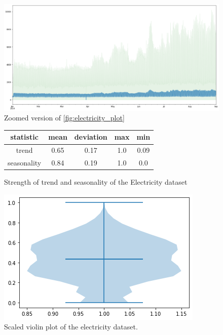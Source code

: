 \begin{figure}[htb]
    \centering
    \includegraphics[width=\linewidth]{./img/electricity_no_negative.png}
    \caption{Zoomed version of \ref{fig:electricity_plot}}
    \label{fig:electricity_plot_zooomed}
    \endminipage\hfill
\end{figure}

\begin{figure}[htb]
    \centering
    \begin{center}
        \begin{tabular}{||c | c | c | c | c |}
            \hline
            statistic   & mean & deviation & max & min  \\
            \hline
            trend       & 0.65 & 0.17      & 1.0 & 0.09 \\
            \hline
            seasonality & 0.84 & 0.19      & 1.0 & 0.0  \\
            \hline
            \hline
        \end{tabular}
        \caption{Strength of trend and seasonality of the Electricity dataset}
    \end{center}
    \endminipage\hfill
    \includegraphics[width=\linewidth]{./img/electricity_violin.png}
    \caption{Scaled violin plot of the electricity dataset.}
    \label{fig:electricity_violin}
    \endminipage\hfill
\end{figure}

